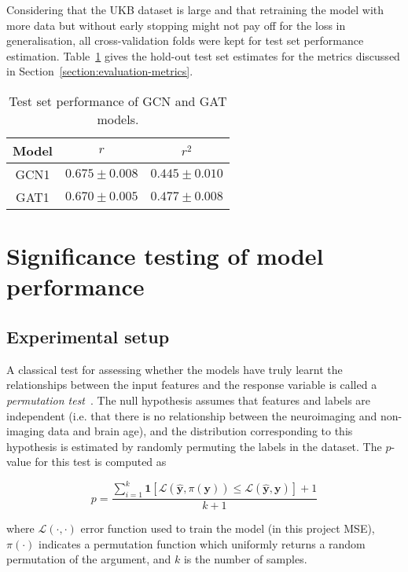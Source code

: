 Considering that the UKB dataset is large and that retraining the model with more data but without early stopping might not pay off for the loss in generalisation, all cross-validation folds were kept for test set performance estimation. Table~\ref{table:test-performance} gives the hold-out test set estimates for the metrics discussed in Section~\ref{section:evaluation-metrics}.

\begin{table}[h]
    \caption{Test set performance of GCN and GAT models.}\label{table:test-performance}
    \centering
    \small
    \begin{tabular}{ccc}
        \hline
    \textbf{Model} & $r$ & $r^2$ \\  \hline
        GCN1 & $0.675 \pm 0.008$ & $0.445 \pm 0.010$ \\
        GAT1 & $0.670 \pm 0.005$ & $0.477 \pm 0.008$ \\ \hline
\end{tabular}
\end{table}


\section{Significance testing of model performance}
\subsection{Experimental setup}
A classical test for assessing whether the models have truly learnt the relationships between the input features and the response variable is called a \textit{permutation test}~\cite{ojala2010permutation}. The null hypothesis assumes that features and labels are independent (i.e. that there is no relationship between the neuroimaging and non-imaging data and brain age), and the distribution corresponding to this hypothesis is estimated by randomly permuting the labels in the dataset. The $p$-value for this test is computed as

\begin{equation}
    p = \frac{\sum_{i=1}^k \mathbf{1}\left[\mathcal{L}(\mathbf{\hat{y}}, \pi(\mathbf{y})) \leq \mathcal{L}(\mathbf{\hat{y}}, \mathbf{y})\right] + 1}{k+1}\label{eq:p-value}
\end{equation}

where $\mathcal{L}(\cdot, \cdot)$ error function used to train the model (in this project MSE), $\pi(\cdot)$ indicates a permutation function which uniformly returns a random permutation of the argument, and $k$ is the number of samples.

